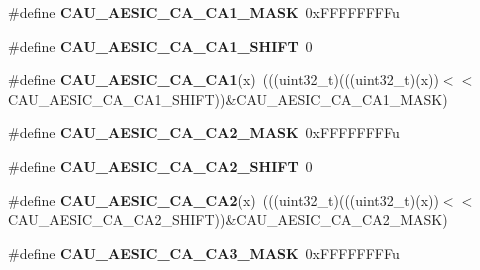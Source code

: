 \begin{DoxyCompactItemize}
\item 
\#define {\bfseries C\+A\+U\+\_\+\+A\+E\+S\+I\+C\+\_\+\+C\+A\+\_\+\+C\+A1\+\_\+\+M\+A\+SK}~0x\+F\+F\+F\+F\+F\+F\+F\+Fu\hypertarget{group__CAU__Register__Masks_gace8bbcda7b100e6febb77206a0b294ca}{}\label{group__CAU__Register__Masks_gace8bbcda7b100e6febb77206a0b294ca}

\item 
\#define {\bfseries C\+A\+U\+\_\+\+A\+E\+S\+I\+C\+\_\+\+C\+A\+\_\+\+C\+A1\+\_\+\+S\+H\+I\+FT}~0\hypertarget{group__CAU__Register__Masks_gaf213071e5350ac7fb8d15b65685e8fa8}{}\label{group__CAU__Register__Masks_gaf213071e5350ac7fb8d15b65685e8fa8}

\item 
\#define {\bfseries C\+A\+U\+\_\+\+A\+E\+S\+I\+C\+\_\+\+C\+A\+\_\+\+C\+A1}(x)~(((uint32\+\_\+t)(((uint32\+\_\+t)(x))$<$$<$C\+A\+U\+\_\+\+A\+E\+S\+I\+C\+\_\+\+C\+A\+\_\+\+C\+A1\+\_\+\+S\+H\+I\+FT))\&C\+A\+U\+\_\+\+A\+E\+S\+I\+C\+\_\+\+C\+A\+\_\+\+C\+A1\+\_\+\+M\+A\+SK)\hypertarget{group__CAU__Register__Masks_ga7c110676eacf3149cb4a6912d40377e9}{}\label{group__CAU__Register__Masks_ga7c110676eacf3149cb4a6912d40377e9}

\item 
\#define {\bfseries C\+A\+U\+\_\+\+A\+E\+S\+I\+C\+\_\+\+C\+A\+\_\+\+C\+A2\+\_\+\+M\+A\+SK}~0x\+F\+F\+F\+F\+F\+F\+F\+Fu\hypertarget{group__CAU__Register__Masks_gaacb6f7c612e15617ec7318cff9480c0f}{}\label{group__CAU__Register__Masks_gaacb6f7c612e15617ec7318cff9480c0f}

\item 
\#define {\bfseries C\+A\+U\+\_\+\+A\+E\+S\+I\+C\+\_\+\+C\+A\+\_\+\+C\+A2\+\_\+\+S\+H\+I\+FT}~0\hypertarget{group__CAU__Register__Masks_ga24294c0df349c7b5264631d50b683247}{}\label{group__CAU__Register__Masks_ga24294c0df349c7b5264631d50b683247}

\item 
\#define {\bfseries C\+A\+U\+\_\+\+A\+E\+S\+I\+C\+\_\+\+C\+A\+\_\+\+C\+A2}(x)~(((uint32\+\_\+t)(((uint32\+\_\+t)(x))$<$$<$C\+A\+U\+\_\+\+A\+E\+S\+I\+C\+\_\+\+C\+A\+\_\+\+C\+A2\+\_\+\+S\+H\+I\+FT))\&C\+A\+U\+\_\+\+A\+E\+S\+I\+C\+\_\+\+C\+A\+\_\+\+C\+A2\+\_\+\+M\+A\+SK)\hypertarget{group__CAU__Register__Masks_ga5442af2bec924cd321147bd405a1a191}{}\label{group__CAU__Register__Masks_ga5442af2bec924cd321147bd405a1a191}

\item 
\#define {\bfseries C\+A\+U\+\_\+\+A\+E\+S\+I\+C\+\_\+\+C\+A\+\_\+\+C\+A3\+\_\+\+M\+A\+SK}~0x\+F\+F\+F\+F\+F\+F\+F\+Fu\hypertarget{group__CAU__Register__Masks_ga889b99e5fda65da20c1e40cdf1633bdc}{}\label{group__CAU__Register__Masks_ga889b99e5fda65da20c1e40cdf1633bdc}


\end{DoxyCompactItemize}
